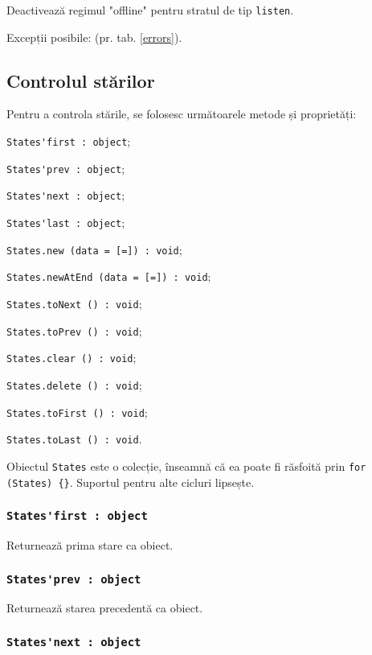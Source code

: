 Deactivează regimul "offline" pentru stratul de tip \lstinline|listen|.

Excepții posibile:  (pr. tab. \ref{errors}).

\subsection{Controlul stărilor}

Pentru a controla stările, se folosesc următoarele metode și proprietăți:
\begin{icItems}
	\item \lstinline|States'first : object|;
	\item \lstinline|States'prev : object|;
	\item \lstinline|States'next : object|;
	\item \lstinline|States'last : object|;
	\item \lstinline|States.new (data = [=]) : void|;
	\item \lstinline|States.newAtEnd (data = [=]) : void|;
	\item \lstinline|States.toNext () : void|;
	\item \lstinline|States.toPrev () : void|;
	\item \lstinline|States.clear () : void|;
	\item \lstinline|States.delete () : void|;
	\item \lstinline|States.toFirst () : void|;
	\item \lstinline|States.toLast () : void|.
\end{icItems}

Obiectul \lstinline|States| este o colecție, înseamnă că ea poate fi răsfoită prin \lstinline|for (States) {}|. Suportul pentru alte cicluri lipsește.

\subsubsection{\lstinline|States'first : object|}

Returnează prima stare ca obiect.

\subsubsection{\lstinline|States'prev : object|}

Returnează starea precedentă ca obiect.

\subsubsection{\lstinline|States'next : object|}

